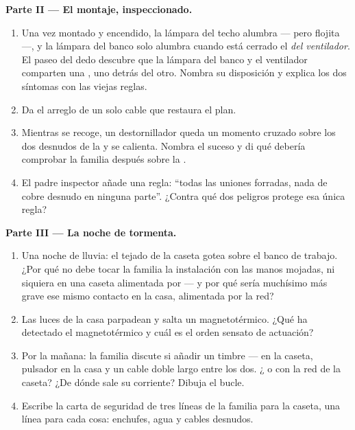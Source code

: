 \begin{problem}
\medskip\noindent\textbf{Parte II --- El montaje, inspeccionado.}
\begin{enumerate}[resume]
  \item Una vez montado y encendido, la lámpara del techo alumbra ---
        pero flojita ---, y la lámpara del banco solo alumbra cuando
        está cerrado el  \emph{del ventilador}. El paseo
        del dedo descubre que la lámpara del banco y el ventilador
        comparten una , uno detrás del otro. Nombra su
        disposición y explica los dos síntomas con las viejas reglas.
  \item Da el arreglo de un solo cable que restaura el plan.
  \item Mientras se recoge, un destornillador queda un momento
        cruzado sobre los dos  desnudos de la  y se
        calienta. Nombra el suceso y di qué debería comprobar la
        familia después sobre la .
  \item El padre inspector añade una regla: ``todas las uniones
        forradas, nada de cobre desnudo en ninguna parte''. ¿Contra
        qué dos peligros protege esa única regla?
\end{enumerate}

\medskip\noindent\textbf{Parte III --- La noche de tormenta.}
\begin{enumerate}[resume]
  \item Una noche de lluvia: el tejado de la caseta gotea sobre el
        banco de trabajo. ¿Por qué no debe tocar la familia la
        instalación con las manos mojadas, ni siquiera en una caseta
        alimentada por  --- y por qué sería muchísimo más grave
        ese mismo contacto en la casa, alimentada por la red?
  \item Las luces de la casa parpadean y salta un
        magnetotérmico. ¿Qué ha detectado el magnetotérmico y cuál es
        el orden sensato de actuación?
  \item Por la mañana: la familia discute si añadir un timbre ---
         en la caseta, pulsador en la casa y un cable
        doble largo entre los dos. ¿ o  con la red
        de la caseta? ¿De dónde sale su corriente? Dibuja el bucle.
  \item Escribe la carta de seguridad de tres líneas de la familia
        para la caseta, una línea para cada cosa: enchufes, agua y
        cables desnudos.
\end{enumerate}
\end{problem}
